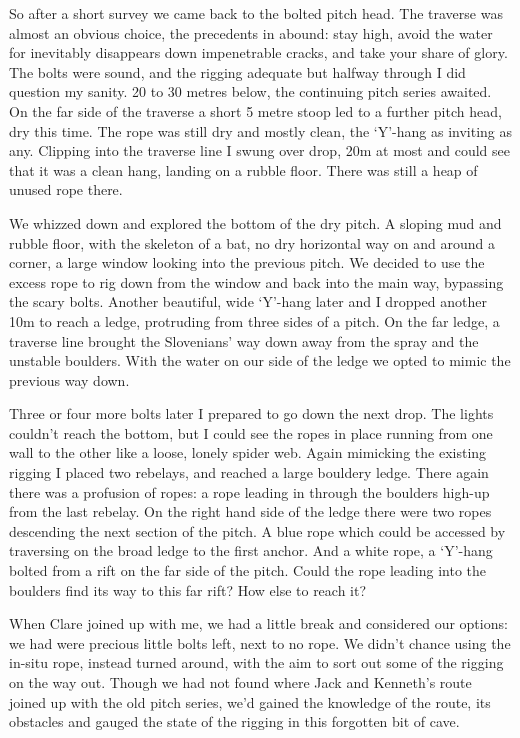 So after a short survey we came back to the bolted pitch head. The traverse was almost an obvious choice, the precedents in  abound: stay high, avoid the water for inevitably disappears down impenetrable cracks, and take your share of glory. The bolts were sound, and the rigging adequate but halfway through I did question my sanity. 20 to 30 metres below, the continuing pitch series awaited. On the far side of the traverse a short 5 metre stoop led to a further pitch head, dry this time. The rope was still dry and mostly clean, the ‘Y’-hang as inviting as any. Clipping into the traverse line I swung over drop, 20m at most and could see that it was a clean hang, landing on a rubble floor. There was still a heap of unused rope there. 

We whizzed down and explored the bottom of the dry pitch. A sloping mud and rubble floor, with the skeleton of a bat, no dry horizontal way on and around a corner, a large window looking into the previous pitch. We decided to use the excess rope to rig down from the window and back into the main way, bypassing the scary bolts. Another beautiful, wide ‘Y’-hang later and I dropped another 10m to reach a ledge, protruding from three sides of a pitch. On the far ledge, a traverse line brought the Slovenians’ way down away from the spray and the unstable boulders. With the water on our side of the ledge we opted to mimic the previous way down. 



Three or four more bolts later I prepared to go down the next drop. The lights couldn’t reach the bottom, but I could see the ropes in place running from one wall to the other like a loose, lonely spider web. Again mimicking the existing rigging I placed two rebelays, and reached a large bouldery ledge. There again there was a profusion of ropes: a rope leading in through the boulders high-up from the last rebelay. On the right hand side of the ledge there were two ropes descending the next section of the pitch. A blue rope which could be accessed by traversing on the broad ledge to the first anchor. And a white rope, a ‘Y’-hang bolted from a rift on the far side of the pitch. Could the rope leading into the boulders find its way to this far rift?  How else to reach it?

When Clare joined up with me, we had a little break and considered our options: we had were precious little bolts left, next to no rope. We didn’t chance using the in-situ rope, instead turned around, with the aim to sort out some of the rigging on the way out. Though we had not found where Jack and Kenneth’s route joined up with the old pitch series, we’d gained the knowledge of the route, its obstacles and gauged the state of the rigging in this forgotten bit of cave. 

